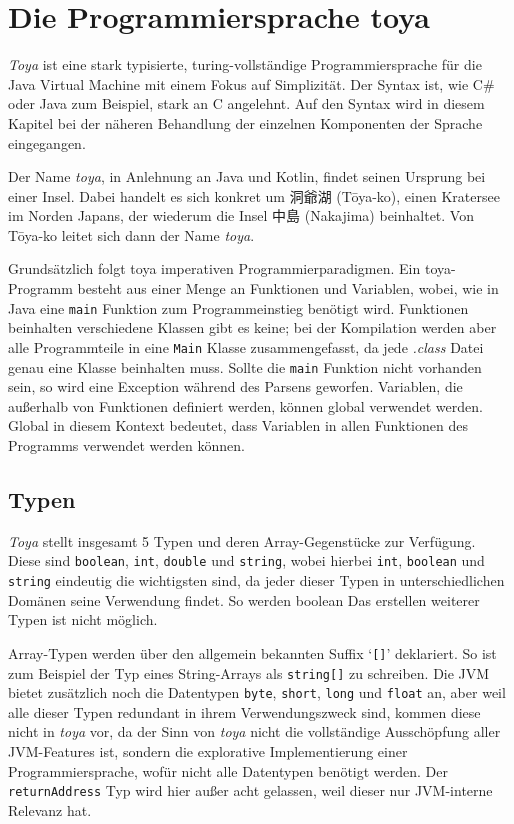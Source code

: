 \chapter{Die Programmiersprache toya}
\label{cha:toya}

\textit{Toya} ist eine stark typisierte, turing-vollständige Programmiersprache für die Java Virtual Machine mit einem Fokus auf Simplizität. Der Syntax ist, wie C\# oder Java zum Beispiel, stark an C angelehnt. Auf den Syntax wird in diesem Kapitel bei der näheren Behandlung der einzelnen Komponenten der Sprache eingegangen. 

\begin{CJK}{UTF8}{ipxm}
Der Name \textit{toya}, in Anlehnung an Java und Kotlin, findet seinen Ursprung bei einer Insel. Dabei handelt es sich konkret um 洞爺湖 (Tōya-ko), einen Kratersee im Norden Japans, der wiederum die Insel 中島 (Nakajima) beinhaltet. Von Tōya-ko leitet sich dann der Name \textit{toya}.
\end{CJK}

Grundsätzlich folgt toya imperativen Programmierparadigmen. Ein toya-Programm besteht aus einer Menge an Funktionen und Variablen, wobei, wie in Java eine \texttt{main} Funktion zum Programmeinstieg benötigt wird. Funktionen beinhalten verschiedene  Klassen gibt es keine; bei der Kompilation werden aber alle Programmteile in eine \texttt{Main} Klasse zusammengefasst, da jede \textit{.class} Datei genau eine Klasse beinhalten muss. Sollte die \texttt{main} Funktion nicht vorhanden sein, so wird eine Exception während des Parsens geworfen. Variablen, die außerhalb von Funktionen definiert werden, können global verwendet werden. Global in diesem Kontext bedeutet, dass Variablen in allen Funktionen des Programms verwendet werden können. 

\section{Typen}

\textit{Toya} stellt insgesamt 5 Typen und deren Array-Gegenstücke zur Verfügung. Diese sind \texttt{boolean}, \texttt{int}, \texttt{double} und \texttt{string}, wobei hierbei \texttt{int}, \texttt{boolean} und \texttt{string} eindeutig die wichtigsten sind, da jeder dieser Typen in unterschiedlichen Domänen seine Verwendung findet. So werden boolean  Das erstellen weiterer Typen ist nicht möglich.

Array-Typen werden über den allgemein bekannten Suffix `\texttt{[]}' deklariert. So ist zum Beispiel der Typ eines String-Arrays als \texttt{string[]} zu schreiben. Die JVM bietet zusätzlich noch die Datentypen \texttt{byte}, \texttt{short}, \texttt{long} und \texttt{float} an, aber weil alle dieser Typen redundant in ihrem Verwendungszweck sind, kommen diese nicht in \textit{toya} vor, da der Sinn von \textit{toya} nicht die vollständige Ausschöpfung aller JVM-Features ist, sondern die explorative Implementierung einer Programmiersprache, wofür nicht alle Datentypen benötigt werden. Der \texttt{returnAddress} Typ wird hier außer acht gelassen, weil dieser nur JVM-interne Relevanz hat.

